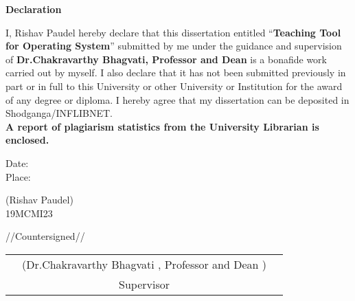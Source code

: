 \begin{onehalfspacing}
\clearpage
\thispagestyle{empty}
\begin{center}
\begin{Large}
\textbf{Declaration}\\
\end{Large}
\end{center}

I, Rishav Paudel hereby declare that this dissertation entitled 
``\textbf{Teaching Tool for Operating System}'' 
submitted by me under the guidance and supervision of \textbf{Dr.Chakravarthy Bhagvati, Professor and Dean} is a bonafide work carried out by myself. 
I also declare that it has not been submitted previously in part or in full to this University or 
other University or Institution for the award of any degree or diploma. I hereby agree that my dissertation can be deposited in Shodganga/INFLIBNET. \\
	
	\textbf{A report of plagiarism statistics from the University Librarian is enclosed.}

\vspace{1in}

\noindent
\parbox[t]{3in}
{\raggedright
Date:\\
Place:\\
}
\parbox[t]{2.5in}
{
\raggedleft 
(Rishav Paudel)\\
19MCMI23\\
}


\vspace{1in}
\begin{center}
  //Countersigned//
  
\end{center}
\vspace{1in}

\begin{table}[h]
\begin{tabular}{ccc} 
 &\hspace{2 cm} (Dr.Chakravarthy Bhagvati , Professor and Dean )  &\hspace{4.9 cm}                \\       
 &\hspace{3 cm}  Supervisor &\hspace{4 cm}                        \\       
\end{tabular}
\end{table}


\end{onehalfspacing}
